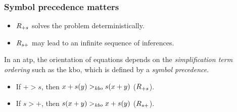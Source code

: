 \begin{frame}
\frametitle{Symbol precedence matters}
\begin{itemize}
\item $R_{+s}$ solves the problem deterministically.
\item $R_{s+}$ may lead to an infinite sequence of inferences.
\end{itemize}
\pause
In an \acrfull{atp}, the orientation of equations depends on the \emph{simplification term ordering}
such as the \acrfull{kbo},
which is defined by a \emph{symbol precedence}.

\begin{itemize}
\item If $+ > s$, then $x + s(y) >_{\mathit{kbo}} s(x + y)$ ($R_{+s}$).
\item If $s > +$, then $s(x + y) >_{\mathit{kbo}} x + s(y)$ ($R_{s+}$).
\end{itemize}
\end{frame}
